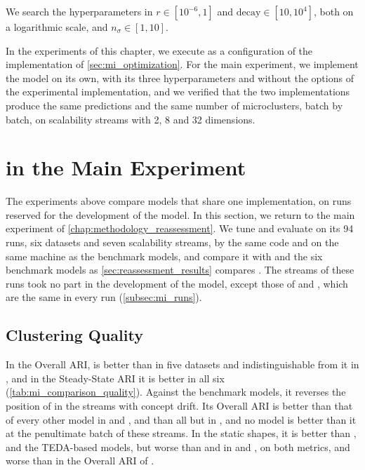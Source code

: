 We search the hyperparameters in $r \in [10^{-6}, 1]$ and $\text{decay} \in [10, 10^4]$, both on a logarithmic scale, and $n_\sigma \in [1, 10]$.

In the experiments of this chapter, we execute \MicroTEDAClusPlus as a configuration of the implementation of \cref{sec:mi_optimization}. For the main experiment, we implement the model on its own, with its three hyperparameters and without the options of the experimental implementation, and we verified that the two implementations produce the same predictions and the same number of microclusters, batch by batch, on scalability streams with 2, 8 and 32 dimensions.

\section{\MicroTEDAClusPlus in the Main Experiment}
\label{sec:mi_main_experiment}

The experiments above compare models that share one implementation, on runs reserved for the development of the model. In this section, we return to the main experiment of \cref{chap:methodology_reassessment}. We tune and evaluate \MicroTEDAClusPlus on its 94 runs, six datasets and seven scalability streams, by the same code and on the same machine as the benchmark models, and compare it with \MicroTEDAClus and the six benchmark models as \cref{sec:reassessment_results} compares \MicroTEDAClus. The streams of these runs took no part in the development of the model, except those of \ChameleonDSThree and \ChameleonDSFour, which are the same in every run (\cref{subsec:mi_runs}).

\subsection{Clustering Quality}
\label{subsec:mi_main_quality}



In the Overall ARI, \MicroTEDAClusPlus is better than \MicroTEDAClus in five datasets and indistinguishable from it in \Cassini, and in the Steady-State ARI it is better in all six (\cref{tab:mi_comparison_quality}). Against the benchmark models, it reverses the position of \MicroTEDAClus in the streams with concept drift. Its Overall ARI is better than that of every other model in \BenchmarkOne and \BenchmarkTwo, and than all but \TEDACloud in \RandomRBFGeneratorEvents, and no model is better than it at the penultimate batch of these streams. In the static shapes, it is better than \MicroTEDAClus, \DenStream and the TEDA-based models, but worse than \CluStream and \StreamKM in \Cassini and \ChameleonDSThree, on both metrics, and worse than \CluStream in the Overall ARI of \ChameleonDSFour.

